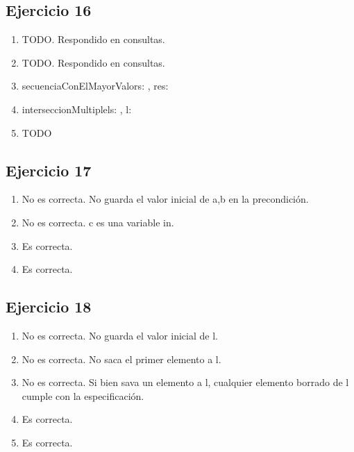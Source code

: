 \subsection{Ejercicio 16}
\begin{enumerate}
    \item TODO. Respondido en consultas.
    \item TODO. Respondido en consultas.
    \item   \begin{proc}{secuenciaConElMayorValor}{\In s: \TLista{\TLista{\ent}}, \Out res: \TLista{\ent}}{}
            \end{proc}
    \item   \begin{proc}{interseccionMultiple}{\In ls: \TLista{\TLista{\float}}, \Out l: \TLista{\float}}{}
            \end{proc}
    \item   TODO
\end{enumerate}

\subsection{Ejercicio 17}
\begin{enumerate}
    \item No es correcta. No guarda el valor inicial de a,b en la precondición. 
    \item No es correcta. c es una variable in.
    \item Es correcta.
    \item Es correcta.
\end{enumerate}

\subsection{Ejercicio 18}
\begin{enumerate}
    \item No es correcta. No guarda el valor inicial de l.
    \item No es correcta. No saca el primer elemento a l.
    \item No es correcta. Si bien sava un elemento a l, cualquier elemento borrado de l cumple con la especificación.
    \item Es correcta.
    \item Es correcta.
\end{enumerate}

